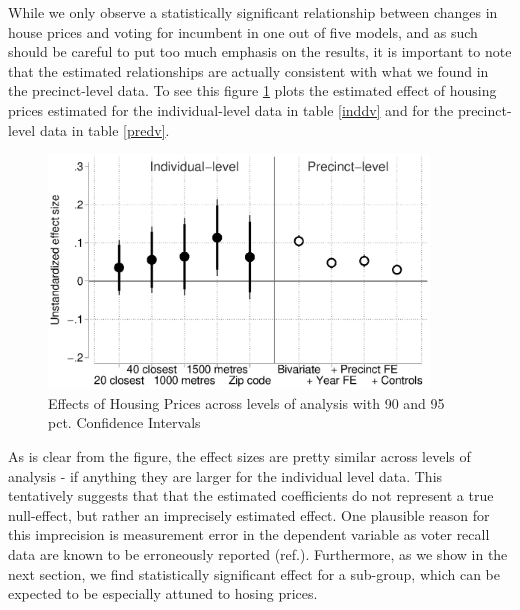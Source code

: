 \documentclass[12pt,a4paper]{article}
\begin{document}
	While we only observe a statistically significant relationship between changes in house prices and voting for incumbent in one out of five models, and as such should be careful to put too much emphasis on the results, it is important to note that the estimated relationships are actually consistent with what we found in the precinct-level data. To see this figure \ref{comparison} plots the estimated effect of housing prices estimated for the individual-level data in table \ref{inddv}  and for the precinct-level data in table \ref{predv}.
	
	\begin{figure}[htbp!]
		\includegraphics[width=0.9\textwidth]{../figures/comparison.eps}
		\centering
		\caption{Effects of Housing Prices across levels of analysis with 90  and 95 pct. Confidence Intervals}\label{comparison}
	\end{figure}
	
	As is clear from the figure, the effect sizes are pretty similar across levels of analysis - if anything they are larger for the individual level data. This tentatively suggests that that the estimated coefficients do not represent a true null-effect, but rather an imprecisely estimated effect. One plausible reason for this imprecision is measurement error in the dependent variable as voter recall data are known to be erroneously reported (ref.). Furthermore, as we show in the next section, we find statistically significant effect for a sub-group, which can be expected to be especially attuned to hosing prices.
	
	
\end{document}
